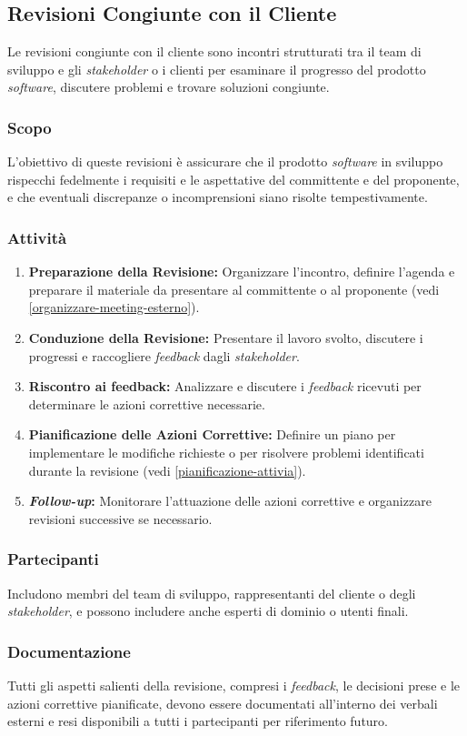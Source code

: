 \subsection{Revisioni Congiunte con il Cliente}

Le revisioni congiunte con il cliente sono incontri strutturati tra il team di
sviluppo e gli \textit{stakeholder} o i clienti per esaminare il progresso del
prodotto \textit{software}, discutere problemi e trovare soluzioni congiunte.

\subsubsection{Scopo}
L'obiettivo di queste revisioni è assicurare che il prodotto \textit{software}
in sviluppo rispecchi fedelmente i requisiti e le aspettative del committente e
del proponente, e che eventuali discrepanze o incomprensioni siano risolte
tempestivamente.

\subsubsection{Attività}
\begin{enumerate}
	\item \textbf{Preparazione della Revisione:} Organizzare l'incontro,
	      definire l'agenda e preparare il materiale da presentare al
	      committente o al proponente (vedi
	      \cref{organizzare-meeting-esterno}).
	\item \textbf{Conduzione della Revisione:} Presentare il lavoro svolto,
	      discutere i progressi e raccogliere \textit{feedback\g} dagli
	      \textit{stakeholder}.
	\item \textbf{Riscontro ai feedback\g:} Analizzare e discutere i
	      \textit{feedback\g} ricevuti per determinare le azioni correttive
	      necessarie.
	\item \textbf{Pianificazione delle Azioni Correttive:} Definire un piano per
	      implementare le modifiche richieste o per risolvere problemi
	      identificati durante la revisione (vedi
	      \cref{pianificazione-attivia}).
	\item \textbf{\textit{Follow-up}:} Monitorare l'attuazione delle azioni
	      correttive e organizzare revisioni successive se necessario.
\end{enumerate}

\subsubsection{Partecipanti}
Includono membri del team di sviluppo, rappresentanti del cliente o degli
\textit{stakeholder}, e possono includere anche esperti di dominio o utenti
finali.

\subsubsection{Documentazione}
Tutti gli aspetti salienti della revisione, compresi i \textit{feedback\g}, le
decisioni prese e le azioni correttive pianificate, devono essere documentati
all'interno dei verbali esterni e resi disponibili a tutti i partecipanti per
riferimento futuro.

